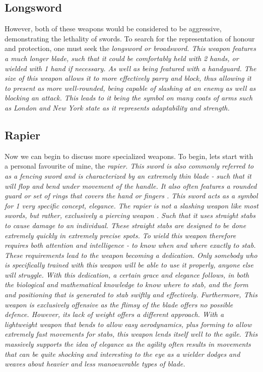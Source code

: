 \documentclass{article}
\begin{document}
\subsection*{Longsword}
However, both of these weapons would be considered to be aggressive, demonstrating the lethality of swords. To search for the representation of honour and protection, one must seek the \em{longsword or broadsword}. This weapon features a much longer blade, such that it could be comfortably held with 2 hands, or wielded with 1 hand if necessary. As well as being featured with a handguard. The size of this weapon allows it to more effectively parry and block, thus allowing it to present as more well-rounded, being capable of slashing at an enemy as well as blocking an attack. This leads to it being the symbol on many coats of arms such as London \parencite{fox1894book} and New York state \parencite{newyorkflag} as it represents adaptability and strength.

\subsection*{Rapier}
Now we can begin to discuss more specialized weapons. To begin, lets start with a personal favourite of mine, the \em{rapier}. This sword is also commonly referred to as a fencing sword and is characterized by an extremely thin blade - such that it will flop and bend under movement of the handle. It also often features a rounded guard or set of rings that covers the hand or fingers \parencite{walker2002rapier12}. This sword acts as a symbol for 1 very specific concept, elegance. The rapier is not a slashing weapon like most swords, but rather, exclusively a piercing weapon \parencite{walker2002rapierNoCut}. Such that it uses straight stabs to cause damage to an individual. These straight stabs are designed to be done extremely quickly in extremely precise spots. To wield this weapon therefore requires both attention and intelligence - to know when and where exactly to stab. These requirements lead to the weapon becoming a dedication. Only somebody who is specifically trained with this weapon will be able to use it properly, anyone else will struggle. With this dedication, a certain grace and elegance follows, in both the biological and mathematical knowledge \parencite{walker2002rapier25} to know where to stab, and the form and positioning that is generated to stab swiftly and effectively. Furthermore, This weapon is exclusively offensive as the flimsy of the blade offers no possible defence. However, its lack of weight offers a different approach. With a lightweight weapon that bends to allow easy aerodynamics, plus forming to allow extremely fast movements for stabs, this weapon lends itself well to the agile. This massively supports the idea of elegance as the agility often results in movements that can be quite shocking and interesting to the eye as a wielder dodges and weaves about heavier and less manoeuvrable types of blade.
\end{document}
